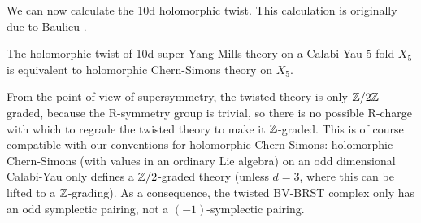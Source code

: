 \documentclass[10pt, oneside]{article}
\begin{document}
We can now calculate the 10d holomorphic twist.  This calculation is originally due to Baulieu \cite{Baulieu}.

\begin{theorem}\label{10d_twist_thm}
The holomorphic twist of 10d super Yang-Mills theory on a Calabi-Yau 5-fold $X_5$ is equivalent to holomorphic Chern-Simons theory on $X_5$.
\end{theorem}

\begin{remark}
From the point of view of supersymmetry, the twisted theory is only $\mathbb Z/2\mathbb Z$-graded, because the R-symmetry group is trivial, so there is no possible R-charge with which to regrade the twisted theory to make it $\mathbb Z$-graded.  
This is of course compatible with our conventions for holomorphic Chern-Simons: holomorphic Chern-Simons (with values in an ordinary Lie algebra) on an odd dimensional Calabi-Yau only defines a $\mathbb Z/2$-graded theory (unless $d=3$, where this can be lifted to a $\mathbb Z$-grading). 
As a consequence, the twisted BV-BRST complex only has an odd symplectic pairing, not a $(-1)$-symplectic pairing.
\end{remark}
\end{document}
